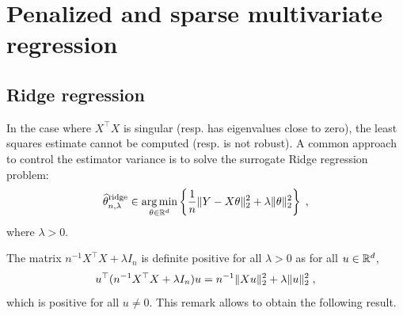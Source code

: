 \chapter{Penalized and sparse multivariate regression}
\minitoc


\section{Ridge regression}
In the case where $X^\top X$ is singular (resp. has eigenvalues close to zero), the least squares estimate cannot be computed (resp. is not robust). A common approach to control the estimator variance is to solve the surrogate Ridge regression problem:
\[
\widehat \param^{\mathrm{ridge}}_{n,\lambda}\in  \argmin_{\param\in\rset^d}  \left\{\frac{1}{n}\|Y - X\param\|_2^2 + \lambda\|\param\|_2^2\right\}\eqsp,
\]
where $\lambda>0$. 
\begin{remark}
The matrix $n^{-1}X^\top X + \lambda  I_n$ is definite positive for all $\lambda>0$ as for all $u\in\mathbb{R}^d$,
\[
u^\top (n^{-1}X^\top X + \lambda I_n)u = n^{-1}\|Xu\|_2^2 + \lambda  \|u\|_2^2\;,
\]
which is positive for all $u\neq 0$. This remark allows to obtain the following result.
\end{remark}

